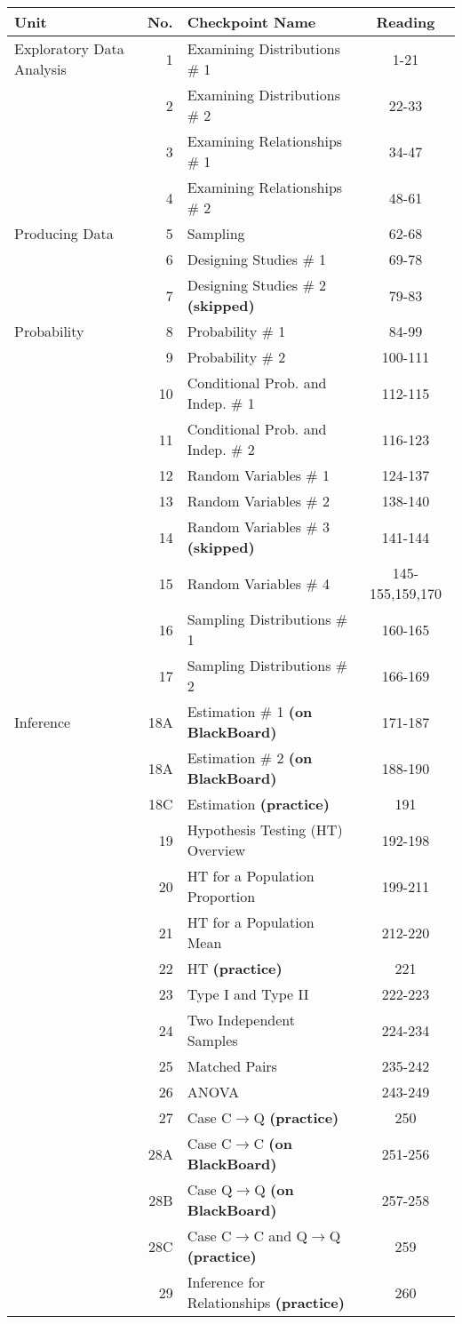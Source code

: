 \documentclass[10pt]{article}
\begin{document}
\begin{tabular}{l|r|l|c}
  Unit & No. & Checkpoint Name &  Reading \\
\hline
Exploratory Data Analysis 
 & 1 & Examining Distributions \# 1 & 1-21 \\
 & 2 & Examining Distributions \# 2 & 22-33     \\
 & 3 & Examining Relationships \# 1 & 34-47     \\ 
 & 4 & Examining Relationships \# 2 & 48-61     \\ 
Producing Data 
 & 5 & Sampling           & 62-68 \\
 & 6 & Designing Studies \# 1       & 69-78  \\
 & 7 & Designing Studies \# 2 {\bfseries (skipped) } & 79-83 \\
Probability 
 & 8 & Probability \# 1   & 84-99  \\
 & 9 & Probability \# 2   & 100-111  \\
 & 10 & Conditional Prob. and Indep. \# 1 & 112-115 \\ 
 & 11 & Conditional Prob. and Indep. \# 2 & 116-123  \\ 
 & 12 & Random Variables \# 1 & 124-137  \\
 & 13 & Random Variables \# 2 & 138-140  \\ 
& 14 & Random Variables \# 3 {\bfseries (skipped)} & 141-144 \\
 & 15 & Random Variables \# 4 & 145-155,159,170 \\
 & 16 & Sampling Distributions \# 1 & 160-165      \\
 & 17 & Sampling Distributions \# 2 & 166-169      \\
Inference 
 & 18A & Estimation \# 1 {\bfseries (on BlackBoard)} & 171-187 \\
 & 18A & Estimation \# 2 {\bfseries (on BlackBoard)} & 188-190 \\
 & 18C & Estimation {\bfseries (practice)} & 191 \\
 & 19 & Hypothesis Testing (HT) Overview  & 192-198  \\
 & 20 & HT for a Population Proportion  &  199-211 \\
 & 21 & HT for a Population Mean  & 212-220 \\
 & 22 & HT {\bfseries (practice)} & 221 \\
 & 23 & Type I and Type II  & 222-223  \\
 & 24 & Two Independent Samples & 224-234 \\
 & 25 & Matched Pairs & 235-242 \\
 & 26 & ANOVA & 243-249  \\ 
 & 27 & Case C$\rightarrow$Q {\bfseries (practice)} & 250    \\
 & 28A & Case C$\rightarrow$C {\bfseries (on BlackBoard)} &  251-256  \\ 
 & 28B & Case Q$\rightarrow$Q {\bfseries (on BlackBoard)} &  257-258  \\ 
 & 28C & Case C$\rightarrow$C and Q$\rightarrow$Q {\bfseries  (practice) } &  259  \\ 
 & 29 & Inference for Relationships {\bfseries (practice) } & 260  
\end{tabular}
\end{document}
